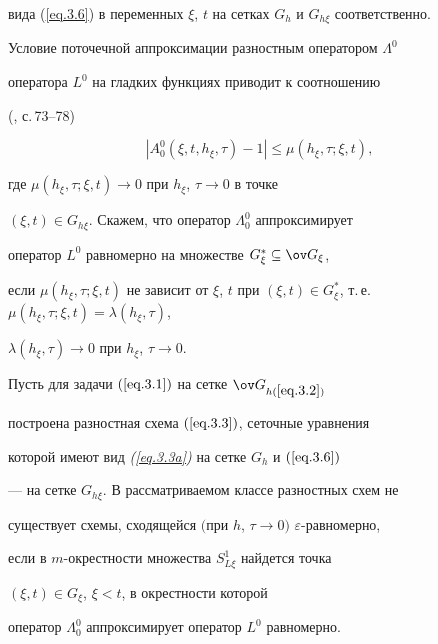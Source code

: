 вида (\ref{eq.3.6}) в переменных $\xi$, $t$ на сетках $G_h$ и $G_{h


\xi}$ соответственно.





Условие поточечной аппроксимации разностным оператором $\Lambda^0$


оператора $L^0$ на гладких функциях приводит к соотношению


(\cite{2}, с.\,73--78)


$$


|A^0_0(\xi, t, h_\xi, \tau)-1|


\le \mu(h_\xi, \tau; \xi, t),


$$


где $\mu(h_\xi, \tau; \xi, t)\to 0$ при $h_\xi$, $\tau\to 0$ в точке


$(\xi, t)\in G_{h \xi}$. Скажем, что оператор $\Lambda^0_0$ аппроксимирует


оператор $L^0$ равномерно на множестве $G^*_\xi\subseteq \ov G_\xi$,


если $\mu(h_\xi, \tau; \xi, t)$ не зависит от $\xi$, $t$ при $(\xi,


t)\in G^*_\xi$, т.\,е. $\mu(h_\xi, \tau; \xi, t)=\lambda(h_\xi, \tau)$,


$\lambda(h_\xi, \tau)\to 0$ при $h_\xi$, $\tau\to 0$.





\begin{lems} \label{l3.2}


Пусть для задачи $(\ref{eq.3.1})$ на сетке $\ov G_{h(\ref{eq.3.2})}$


построена разностная схема $(\ref{eq.3.3})$, сеточные уравнения


которой имеют вид {\em (\ref{eq.3.3a})} на сетке $G_h$ и $(\ref{eq.3.6})$


--- на сетке $G_{h \xi}$. В рассматриваемом классе разностных схем не


существует схемы, сходящейся $($при $h$, $\tau\to0)$ $\varepsilon$-равномерно,


если в $m$-окрестности множества $S^1_{L\xi}$ найдется точка


$(\xi,t)\in G_\xi$, $\xi<t$, в окрестности которой


оператор $\Lambda^0_0$ аппроксимирует оператор $L^0$ равномерно.


\end{lems}





